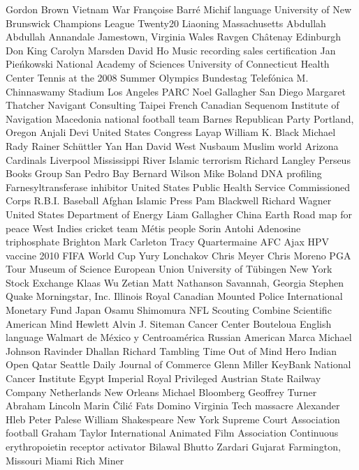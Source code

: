 Gordon Brown  Vietnam War  Françoise Barré  
Michif language  University of New Brunswick  Champions League Twenty20  
Liaoning  Massachusetts  Abdullah Abdullah  
Annandale  Jamestown, Virginia  Wales  
Ravgen  Châtenay  Edinburgh  
Don King   Carolyn Marsden  David Ho   
Music recording sales certification  Jan Pieńkowski  National Academy of Sciences  
University of Connecticut Health Center  Tennis at the 2008 Summer Olympics  Bundestag  
Telefónica  M. Chinnaswamy Stadium  Los Angeles  
PARC   Noel Gallagher  San Diego  
Margaret Thatcher  Navigant Consulting  Taipei  
French Canadian  Sequenom  Institute of Navigation  
Macedonia national football team  Barnes  Republican Party   
Portland, Oregon  Anjali Devi  United States Congress  
Layap  William K. Black  Michael Rady  
Rainer Schüttler  Yan Han   David West   
Nusbaum  Muslim world  Arizona Cardinals  
Liverpool  Mississippi River  Islamic terrorism  
Richard Langley  Perseus Books Group  San Pedro Bay   
Bernard Wilson   Mike Boland   DNA profiling  
Farnesyltransferase inhibitor  United States Public Health Service Commissioned Corps  R.B.I. Baseball  
Afghan Islamic Press  Pam Blackwell  Richard Wagner  
United States Department of Energy  Liam Gallagher  China  
Earth  Road map for peace  West Indies cricket team  
Métis people   Sorin Antohi  Adenosine triphosphate  
Brighton  Mark Carleton  Tracy Quartermaine  
AFC Ajax  HPV vaccine  2010 FIFA World Cup  
Yury Lonchakov  Chris Meyer  Chris Moreno  
PGA Tour  Museum of Science   European Union  
University of Tübingen  New York Stock Exchange  Klaas  
Wu Zetian  Matt Nathanson  Savannah, Georgia  
Stephen Quake  Morningstar, Inc.  Illinois  
Royal Canadian Mounted Police  International Monetary Fund  Japan  
Osamu Shimomura  NFL Scouting Combine  Scientific American Mind  
Hewlett  Alvin J. Siteman Cancer Center  Bouteloua  
English language  Walmart de México y Centroamérica  Russian American  
Marca   Michael Johnson   Ravinder Dhallan  
Richard Tambling  Time Out of Mind  Hero Indian Open  
Qatar  Seattle Daily Journal of Commerce  Glenn Miller  
KeyBank  National Cancer Institute Egypt  Imperial Royal Privileged Austrian State Railway Company  
Netherlands  New Orleans  Michael Bloomberg  
Geoffrey Turner   Abraham Lincoln  Marin Čilić  
Fats Domino  Virginia Tech massacre  Alexander Hleb  
Peter Palese  William Shakespeare  New York Supreme Court  
Association football  Graham Taylor   International Animated Film Association  
Continuous erythropoietin receptor activator  Bilawal Bhutto Zardari  Gujarat  
Farmington, Missouri  Miami  Rich Miner  

